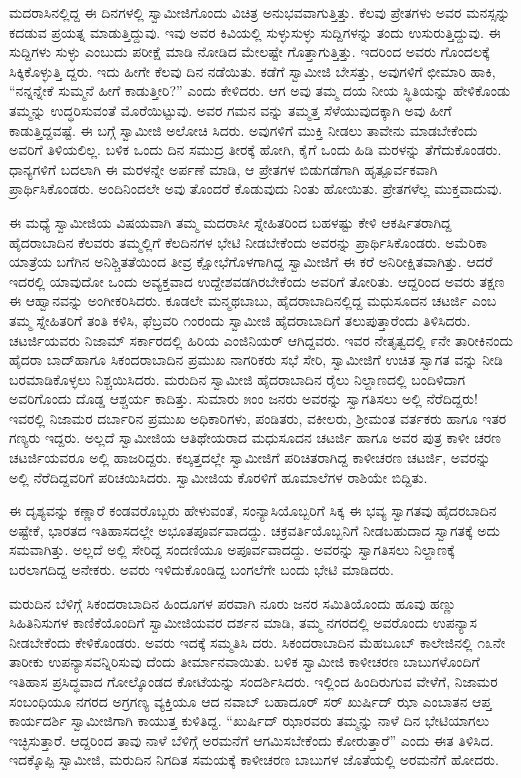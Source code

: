 ಮದರಾಸಿನಲ್ಲಿದ್ದ ಈ ದಿನಗಳಲ್ಲಿ ಸ್ವಾಮೀಜಿಗೊಂದು ವಿಚಿತ್ರ ಅನುಭವವಾಗುತ್ತಿತ್ತು. ಕೆಲವು ಪ್ರೇತಗಳು ಅವರ ಮನಸ್ಸನ್ನು ಕದಡುವ ಪ್ರಯತ್ನ ಮಾಡುತ್ತಿದ್ದುವು. ಇವು ಅವರ ಕಿವಿಯಲ್ಲಿ ಸುಳ್ಳುಸುಳ್ಳು ಸುದ್ದಿಗಳನ್ನು ತಂದು ಉಸುರುತ್ತಿದ್ದುವು. ಈ ಸುದ್ದಿಗಳು ಸುಳ್ಳು ಎಂಬುದು ಪರೀಕ್ಷೆ ಮಾಡಿ ನೋಡಿದ ಮೇಲಷ್ಟೇ ಗೊತ್ತಾಗುತ್ತಿತ್ತು. ಇದರಿಂದ ಅವರು ಗೊಂದಲಕ್ಕೆ ಸಿಕ್ಕಿಕೊಳ್ಳುತ್ತಿ ದ್ದರು. ಇದು ಹೀಗೇ ಕೆಲವು ದಿನ ನಡೆಯಿತು. ಕಡೆಗೆ ಸ್ವಾಮೀಜಿ ಬೇಸತ್ತು, ಅವುಗಳಿಗೆ ಛೀಮಾರಿ ಹಾಕಿ, “ನನ್ನನ್ನೇಕೆ ಸುಮ್ಮನೆ ಹೀಗೆ ಕಾಡುತ್ತೀರಿ?” ಎಂದು ಕೇಳಿದರು. ಆಗ ಅವು ತಮ್ಮ ದಯ ನೀಯ ಸ್ಥಿತಿಯನ್ನು ಹೇಳಿಕೊಂಡು ತಮ್ಮನ್ನು ಉದ್ಧರಿಸುವಂತೆ ಮೊರೆಯಿಟ್ಟುವು. ಅವರ ಗಮನ ವನ್ನು ತಮ್ಮತ್ತ ಸೆಳೆಯುವುದಕ್ಕಾಗಿ ಅವು ಹೀಗೆ ಕಾಡುತ್ತಿದ್ದವಷ್ಟೆ. ಈ ಬಗ್ಗೆ ಸ್ವಾಮೀಜಿ ಅಲೋಚಿ ಸಿದರು. ಅವುಗಳಿಗೆ ಮುಕ್ತಿ ನೀಡಲು ತಾವೇನು ಮಾಡಬೇಕೆಂದು ಅವರಿಗೆ ತಿಳಿಯಲಿಲ್ಲ. ಬಳಿಕ ಒಂದು ದಿನ ಸಮುದ್ರ ತೀರಕ್ಕೆ ಹೋಗಿ, ಕೈಗೆ ಒಂದು ಹಿಡಿ ಮರಳನ್ನು ತೆಗೆದುಕೊಂಡರು. ಧಾನ್ಯಗಳಿಗೆ ಬದಲಾಗಿ ಈ ಮರಳನ್ನೇ ಅರ್ಪಣೆ ಮಾಡಿ, ಆ ಪ್ರೇತಗಳ ಬಿಡುಗಡೆಗಾಗಿ ಹೃತ್ಪೂರ್ವಕವಾಗಿ ಪ್ರಾರ್ಥಿಸಿಕೊಂಡರು. ಅಂದಿನಿಂದಲೇ ಅವು ತೊಂದರೆ ಕೊಡುವುದು ನಿಂತು ಹೋಯಿತು. ಪ್ರೇತಗಳೆಲ್ಲ ಮುಕ್ತವಾದುವು.

ಈ ಮಧ್ಯೆ ಸ್ವಾಮೀಜಿಯ ವಿಷಯವಾಗಿ ತಮ್ಮ ಮದರಾಸೀ ಸ್ನೇಹಿತರಿಂದ ಬಹಳಷ್ಟು ಕೇಳಿ ಆಕರ್ಷಿತರಾಗಿದ್ದ ಹೈದರಾಬಾದಿನ ಕೆಲವರು ತಮ್ಮಲ್ಲಿಗೆ ಕೆಲದಿನಗಳ ಭೇಟಿ ನೀಡಬೇಕೆಂದು ಅವರನ್ನು ಪ್ರಾರ್ಥಿಸಿಕೊಂಡರು. ಅಮೆರಿಕಾ ಯಾತ್ರೆಯ ಬಗೆಗಿನ ಅನಿಶ್ಚಿತತೆಯಿಂದ ತೀವ್ರ ಕ್ಷೋಭೆಗೊಳಗಾಗಿದ್ದ ಸ್ವಾಮೀಜಿಗೆ ಈ ಕರೆ ಅನಿರೀಕ್ಷಿತವಾಗಿತ್ತು. ಆದರೆ ಇದರಲ್ಲಿ ಯಾವುದೋ ಒಂದು ಅವ್ಯಕ್ತವಾದ ಉದ್ದೇಶವಡಗಿರಬೇಕೆಂದು ಅವರಿಗೆ ತೋರಿತು. ಆದ್ದರಿಂದ ಅವರು ತಕ್ಷಣ ಈ ಆಹ್ವಾನವನ್ನು ಅಂಗೀಕರಿಸಿದರು. ಕೂಡಲೇ ಮನ್ಮಥಬಾಬು, ಹೈದರಾಬಾದಿನಲ್ಲಿದ್ದ ಮಧುಸೂದನ ಚಟರ್ಜಿ ಎಂಬ ತಮ್ಮ ಸ್ನೇಹಿತರಿಗೆ ತಂತಿ ಕಳಿಸಿ, ಫೆಬ್ರವರಿ ೧ಂರಂದು ಸ್ವಾಮೀಜಿ ಹೈದರಾಬಾದಿಗೆ ತಲುಪುತ್ತಾರೆಂದು ತಿಳಿಸಿದರು. ಚಟರ್ಜಿಯವರು ನಿಜಾಮ್ ಸರ್ಕಾರದಲ್ಲಿ ಹಿರಿಯ ಎಂಜಿನಿಯರ್ ಆಗಿದ್ದವರು. ಇವರ ನೇತೃತ್ವದಲ್ಲಿ ೯ನೇ ತಾರೀಕಿನಂದು ಹೈದರಾ ಬಾದ್​ಹಾಗೂ ಸಿಕಂದರಾಬಾದಿನ ಪ್ರಮುಖ ನಾಗರಿಕರು ಸಭೆ ಸೇರಿ, ಸ್ವಾಮೀಜಿಗೆ ಉಚಿತ ಸ್ವಾಗತ ವನ್ನು ನೀಡಿ ಬರಮಾಡಿಕೊಳ್ಳಲು ನಿಶ್ಚಯಿಸಿದರು. ಮರುದಿನ ಸ್ವಾಮೀಜಿ ಹೈದರಾಬಾದಿನ ರೈಲು ನಿಲ್ದಾಣದಲ್ಲಿ ಬಂದಿಳಿದಾಗ ಅವರಿಗೊಂದು ದೊಡ್ಡ ಆಶ್ಚರ್ಯ ಕಾದಿತ್ತು. ಸುಮಾರು ೫ಂಂ ಜನರು ಅವರನ್ನು ಸ್ವಾಗತಿಸಲು ಅಲ್ಲಿ ನೆರೆದಿದ್ದರು! ಇವರಲ್ಲಿ ನಿಜಾಮರ ದರ್ಬಾರಿನ ಪ್ರಮುಖ ಅಧಿಕಾರಿಗಳು, ಪಂಡಿತರು, ವಕೀಲರು, ಶ್ರೀಮಂತ ವರ್ತಕರು ಹಾಗೂ ಇತರ ಗಣ್ಯರು ಇದ್ದರು. ಅಲ್ಲದೆ ಸ್ವಾಮೀಜಿಯ ಆತಿಥೇಯರಾದ ಮಧುಸೂದನ ಚಟರ್ಜಿ ಹಾಗೂ ಅವರ ಪುತ್ರ ಕಾಳೀ ಚರಣ ಚಟರ್ಜಿಯವರೂ ಅಲ್ಲಿ ಹಾಜರಿದ್ದರು. ಕಲ್ಕತ್ತದಲ್ಲೇ ಸ್ವಾಮೀಜಿಗೆ ಪರಿಚಿತರಾಗಿದ್ದ ಕಾಳೀಚರಣ ಚಟರ್ಜಿ, ಅವರನ್ನು ಅಲ್ಲಿ ನೆರೆದಿದ್ದವರಿಗೆ ಪರಿಚಯಿಸಿದರು. ಸ್ವಾಮೀಜಿಯ ಕೊರಳಿಗೆ ಹೂಮಾಲೆಗಳ ರಾಶಿಯೇ ಬಿದ್ದಿತು.

ಈ ದೃಶ್ಯವನ್ನು ಕಣ್ಣಾರೆ ಕಂಡವರೊಬ್ಬರು ಹೇಳುವಂತೆ, ಸಂನ್ಯಾಸಿಯೊಬ್ಬರಿಗೆ ಸಿಕ್ಕ ಈ ಭವ್ಯ ಸ್ವಾಗತವು ಹೈದರಬಾದಿನ ಅಷ್ಟೇಕೆ, ಭಾರತದ ಇತಿಹಾಸದಲ್ಲೇ ಅಭೂತಪೂರ್ವವಾದದ್ದು. ಚಕ್ರವರ್ತಿಯೊಬ್ಬನಿಗೆ ನೀಡಬಹುದಾದ ಸ್ವಾಗತಕ್ಕೆ ಅದು ಸಮವಾಗಿತ್ತು. ಅಲ್ಲದೆ ಅಲ್ಲಿ ಸೇರಿದ್ದ ಸಂದಣಿಯೂ ಅಪೂರ್ವವಾದದ್ದು. ಅವರನ್ನು ಸ್ವಾಗತಿಸಲು ನಿಲ್ದಾಣಕ್ಕೆ ಬರಲಾಗದಿದ್ದ ಅನೇಕರು. ಅವರು ಇಳಿದುಕೊಂಡಿದ್ದ ಬಂಗಲೆಗೇ ಬಂದು ಭೇಟಿ ಮಾಡಿದರು.

ಮರುದಿನ ಬೆಳಿಗ್ಗೆ ಸಿಕಂದರಾಬಾದಿನ ಹಿಂದೂಗಳ ಪರವಾಗಿ ನೂರು ಜನರ ಸಮಿತಿಯೊಂದು ಹೂವು ಹಣ್ಣು ಸಿಹಿತಿನಿಸುಗಳ ಕಾಣಿಕೆಯೊಂದಿಗೆ ಸ್ವಾಮೀಜಿಯವರ ದರ್ಶನ ಮಾಡಿ, ತಮ್ಮ ನಗರದಲ್ಲಿ ಅವರೊಂದು ಉಪನ್ಯಾಸ ನೀಡಬೇಕೆಂದು ಕೇಳಿಕೊಂಡರು. ಅವರು ಇದಕ್ಕೆ ಸಮ್ಮತಿಸಿ ದರು. ಸಿಕಂದರಾಬಾದಿನ ಮೆಹಬೂಬ್ ಕಾಲೇಜಿನಲ್ಲಿ ೧೩ನೇ ತಾರೀಕು ಉಪನ್ಯಾಸವನ್ನಿರಿಸುವು ದೆಂದು ತೀರ್ಮಾನವಾಯಿತು. ಬಳಿಕ ಸ್ವಾಮೀಜಿ ಕಾಳೀಚರಣ ಬಾಬುಗಳೊಂದಿಗೆ ಇತಿಹಾಸ ಪ್ರಸಿದ್ಧವಾದ ಗೋಲ್ಕೊಂಡದ ಕೋಟೆಯನ್ನು ಸಂದರ್ಶಿಸಿದರು. ಇಲ್ಲಿಂದ ಹಿಂದಿರುಗುವ ವೇಳೆಗೆ, ನಿಜಾಮರ ಸಂಬಂಧಿಯೂ ನಗರದ ಅಗ್ರಗಣ್ಯ ವ್ಯಕ್ತಿಯೂ ಆದ ನವಾಬ್ ಬಹಾದೂರ್ ಸರ್ ಖುರ್ಷಿದ್ ಝಾ ಎಂಬಾತನ ಆಪ್ತ ಕಾರ್ಯದರ್ಶಿ ಸ್ವಾಮೀಜಿಗಾಗಿ ಕಾಯುತ್ತ ಕುಳಿತಿದ್ದ. “ಖುರ್ಷಿದ್ ಝಾರವರು ತಮ್ಮನ್ನು ನಾಳೆ ದಿನ ಭೇಟಿಯಾಗಲು ಇಚ್ಛಿಸುತ್ತಾರೆ. ಆದ್ದರಿಂದ ತಾವು ನಾಳೆ ಬೆಳಿಗ್ಗೆ ಅರಮನೆಗೆ ಆಗಮಿಸಬೇಕೆಂದು ಕೋರುತ್ತಾರೆ” ಎಂದು ಈತ ತಿಳಿಸಿದ. ಇದಕ್ಕೊಪ್ಪಿ ಸ್ವಾಮೀಜಿ, ಮರುದಿನ ನಿಗದಿತ ಸಮಯಕ್ಕೆ ಕಾಳೀಚರಣ ಬಾಬುಗಳ ಜೊತೆಯಲ್ಲಿ ಅರಮನೆಗೆ ಹೋದರು.

